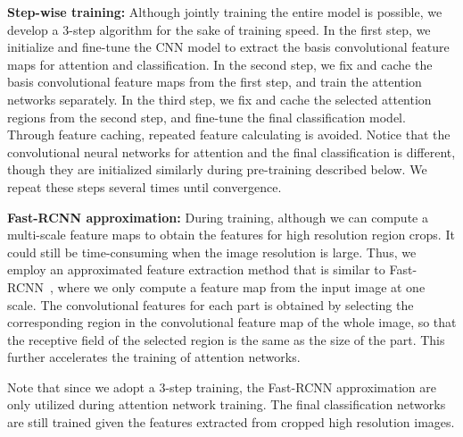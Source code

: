 \documentclass[10pt,twocolumn,letterpaper]{article}
\begin{document}
\textbf{Step-wise training:} Although jointly training the entire model is possible, we develop a 3-step algorithm for the sake of training speed.
In the first step, we initialize and fine-tune the CNN model to extract the basis convolutional feature maps for attention and classification.
In the second step, we fix and cache the basis convolutional feature maps from the first step, and train the attention networks separately.
In the third step, we fix and cache the selected attention regions from the second step, and fine-tune the final classification model.
Through feature caching, repeated feature calculating is avoided.
Notice that the convolutional neural networks for attention and the final classification is different, though they are initialized similarly during pre-training described below.
We repeat these steps several times until convergence.

\textbf{Fast-RCNN approximation:} During training, although we can compute a multi-scale feature maps to obtain the features for high resolution region crops. It could still be time-consuming when the image resolution is large.
Thus, we employ an approximated feature extraction method that is similar to Fast-RCNN~\cite{girshick2015fast}, where we only compute a feature map from the input image at one scale.
The convolutional features for each part is obtained by selecting the corresponding region in the convolutional feature map of the whole image, so that the receptive field of the selected region is the same as the size of the part.
This further accelerates the training of attention networks.

Note that since we adopt a 3-step training, the Fast-RCNN approximation are only utilized during attention network training.
The final classification networks are still trained given the features extracted from cropped high resolution images.


\end{document}
